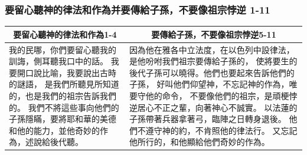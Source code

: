 \subsubsection{要留心聽神的律法和作為并要傳給子孫，不要像祖宗悖逆 1-11}
\begin{table}[H]
\hspace{-6mm}
\centering
\begin{tabular}{p{6.75cm}|p{10.75cm}}\hline\hline
\multicolumn{1}{c|}{要留心聽神的律法和作為1-4}&\multicolumn{1}{c}{要傳給子孫，不要像祖宗悖逆5-11}\\\hline\hline
我的民哪，你們要留心聽我的訓誨，側耳聽我口中的話。
我要開口說比喻，我要說出古時的謎語，
是我們所聽見所知道的，也是我們的祖宗告訴我們的。
我們不將這些事向他們的子孫隱瞞，要將耶和華的美德和他的能力，並他奇妙的作為，述說給後代聽。
&因為他在雅各中立法度，在以色列中設律法，是他吩咐我們祖宗要傳給子孫的，
使將要生的後代子孫可以曉得。他們也要起來告訴他們的子孫，
好叫他們仰望神，不忘記神的作為，唯要守他的命令，
不要像他們的祖宗，是頑梗悖逆居心不正之輩，向著神心不誠實。
以法蓮的子孫帶著兵器拿著弓，臨陣之日轉身退後。
他們不遵守神的約，不肯照他的律法行。
又忘記他所行的，和他顯給他們奇妙的作為。\\\hline
\end{tabular}
\end{table}

